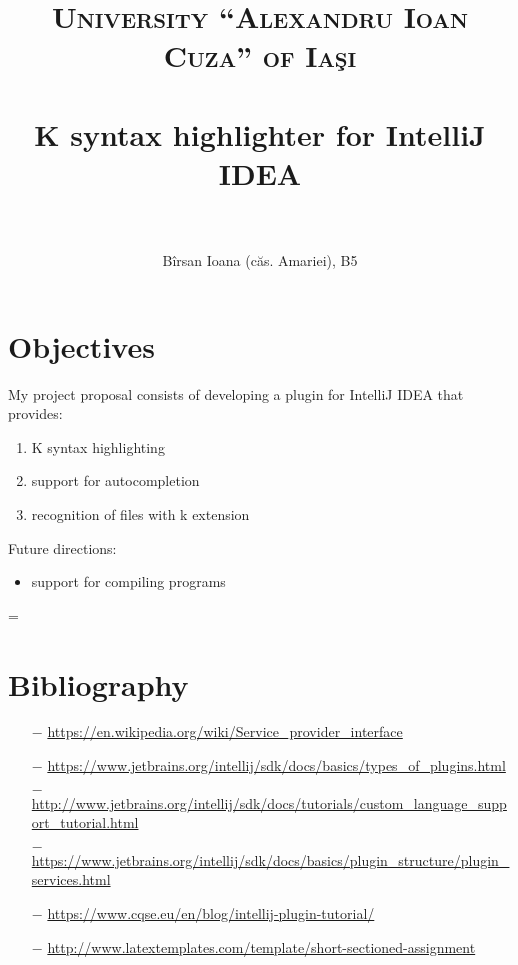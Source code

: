 \documentclass[paper=a4, fontsize=11pt]{scrartcl} %
\title{	
\normalfont \normalsize 
\textsc{University ``Alexandru Ioan Cuza'' of Iaşi} \\ [0pt] %
\horrule{0.5pt} \\[0.4cm] %
\huge K syntax highlighter for IntelliJ IDEA\\ %
\horrule{2pt} \\[0.5cm] %
}
\author{Bîrsan Ioana (căs. Amariei), B5} %
\date{} %
\begin{document}
\maketitle %

\section*{Objectives}
My project proposal consists of developing a plugin for IntelliJ IDEA that provides:
\begin{enumerate}
	\item{K syntax highlighting} 
	\item{support for autocompletion}
	\item{recognition of files with k extension}	
\end{enumerate}
Future directions: 
\begin{itemize}
	\item{support for compiling programs}
\end{itemize}

\parskip = \baselineskip %

\section*{Bibliography}
\begin{enumerate}
	\item[$-$]  \url{https://en.wikipedia.org/wiki/Service_provider_interface}
	\item[$-$]  \url{https://www.jetbrains.org/intellij/sdk/docs/basics/types_of_plugins.html}
	\item[$-$]  \url{http://www.jetbrains.org/intellij/sdk/docs/tutorials/custom_language_support_tutorial.html}
	\item[$-$]  \url{https://www.jetbrains.org/intellij/sdk/docs/basics/plugin_structure/plugin_services.html}
	\item[$-$] \url{https://www.cqse.eu/en/blog/intellij-plugin-tutorial/}
	\item[$-$] \url{http://www.latextemplates.com/template/short-sectioned-assignment}
\end{enumerate}
\end{document}
